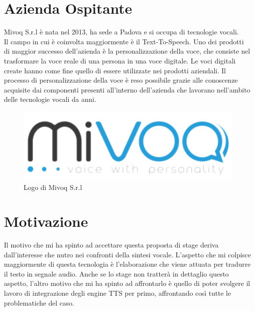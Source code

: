 \section{Azienda Ospitante}
Mivoq S.r.l è nata nel 2013, ha sede a Padova e si occupa di tecnologie vocali.\\
Il campo in cui è coinvolta maggiormente è il Text-To-Speech. Uno dei prodotti di maggior successo dell'azienda è la personalizzazione della voce, che consiste nel trasformare la voce reale di una persona in una voce digitale. Le voci digitali create hanno come fine quello di essere utilizzate nei prodotti aziendali.
Il processo di personalizzazione della voce è reso possibile grazie alle conoscenze acquisite dai componenti presenti all'interno dell'azienda che lavorano nell'ambito delle tecnologie vocali da anni.
\begin{figure}[H]
\centering
\includegraphics{images/logo-mivoq.png}
\caption{Logo di Mivoq S.r.l}
\end{figure}

\section{Motivazione}
Il motivo che mi ha spinto ad accettare questa proposta di stage deriva dall'interesse che nutro nei confronti della sintesi vocale.
L'aspetto che mi colpisce maggiormente di questa tecnologia è l'elaborazione che viene attuata per tradurre il testo in segnale audio.
Anche se lo stage non tratterà in dettaglio questo aspetto, l'altro motivo che mi ha spinto ad affrontarlo è quello di poter svolgere il lavoro di integrazione degli engine TTS per primo, affrontando così tutte le problematiche del caso. 

